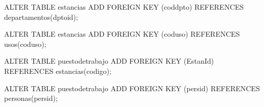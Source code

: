 \lstset{caption=Añadir claves ajenas,label=sql:crearForeignKey}
\begin{SQL}
ALTER TABLE estancias 
ADD FOREIGN KEY (coddpto) REFERENCES departamentos(dptoid);

ALTER TABLE estancias 
ADD FOREIGN KEY (coduso) REFERENCES usos(coduso);

ALTER TABLE puestodetrabajo 
ADD FOREIGN KEY (EstanId) REFERENCES estancias(codigo);

ALTER TABLE puestodetrabajo 
ADD FOREIGN KEY (persid) REFERENCES personas(persid);
\end{SQL}
